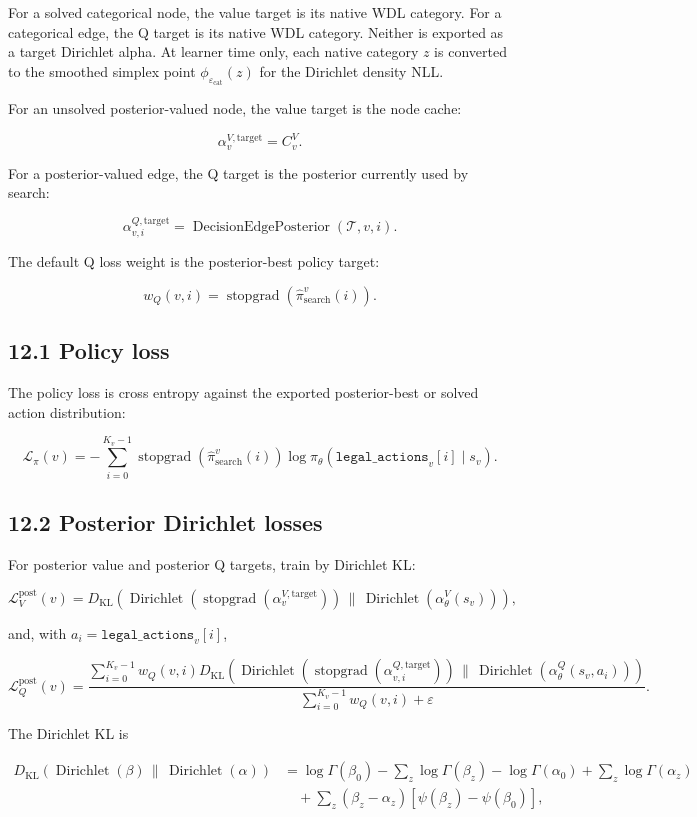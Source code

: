 \documentclass[11pt]{article}
\newcommand{\eps}{\varepsilon}
\newcommand{\Dir}{\operatorname{Dirichlet}}
\newcommand{\stopgrad}{\operatorname{stopgrad}}
\newcommand{\KL}{D_{\mathrm{KL}}}
\newcommand{\Tree}{\mathcal{T}}
\newcommand{\DecisionEdgePosterior}{\operatorname{DecisionEdgePosterior}}
\begin{document}
For a solved categorical node, the value target is its native WDL category. For
a categorical edge, the Q target is its native WDL category. Neither is exported
as a target Dirichlet alpha. At learner time only, each native category \(z\) is
converted to the smoothed simplex point \(\phi_{\eps_{\mathrm{cat}}}(z)\) for
the Dirichlet density NLL.

For an unsolved posterior-valued node, the value target is the node cache:

\[
\alpha^{V,\mathrm{target}}_v=C^V_v.
\]

For a posterior-valued edge, the Q target is the posterior currently used by
search:

\[
\alpha^{Q,\mathrm{target}}_{v,i}
=
\DecisionEdgePosterior(\Tree,v,i).
\]

The default Q loss weight is the posterior-best policy target:

\[
w_Q(v,i)=\stopgrad(\hat\pi_{\mathrm{search}}^v(i)).
\]

\subsection*{12.1 Policy loss}

The policy loss is cross entropy against the exported posterior-best or solved
action distribution:

\[
\mathcal{L}_\pi(v)
=
-
\sum_{i=0}^{K_v-1}
\stopgrad(\hat\pi_{\mathrm{search}}^v(i))
\log \pi_\theta(\texttt{legal\_actions}_v[i]\mid s_v).
\]

\subsection*{12.2 Posterior Dirichlet losses}

For posterior value and posterior Q targets, train by Dirichlet KL:

\[
\mathcal{L}_V^{\mathrm{post}}(v)
=
\KL\left(
\Dir(\stopgrad(\alpha^{V,\mathrm{target}}_v))
\,\|\,
\Dir(\alpha_\theta^V(s_v))
\right),
\]

and, with \(a_i=\texttt{legal\_actions}_v[i]\),

\[
\mathcal{L}_Q^{\mathrm{post}}(v)
=
\frac{
\sum_{i=0}^{K_v-1}w_Q(v,i)
\KL\left(
\Dir(\stopgrad(\alpha^{Q,\mathrm{target}}_{v,i}))
\,\|\,
\Dir(\alpha_\theta^Q(s_v,a_i))
\right)
}{
\sum_{i=0}^{K_v-1}w_Q(v,i)+\eps
}.
\]

The Dirichlet KL is

\[
\begin{aligned}
\KL(\Dir(\beta)\,\|\,\Dir(\alpha))
&=
\log\Gamma(\beta_0)-\sum_z\log\Gamma(\beta_z)
-
\log\Gamma(\alpha_0)+\sum_z\log\Gamma(\alpha_z)\\
&\quad+
\sum_z(\beta_z-\alpha_z)
\left[\psi(\beta_z)-\psi(\beta_0)\right],
\end{aligned}
\]
\end{document}

